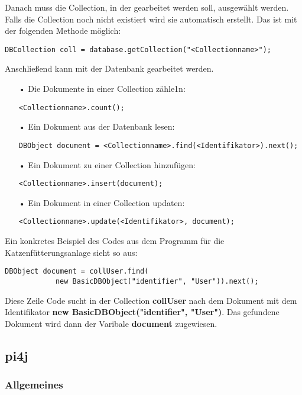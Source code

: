 Danach muss die Collection, in der gearbeitet werden soll, ausgewählt werden. Falls die Collection noch nicht existiert wird sie automatisch erstellt. Das ist mit der folgenden Methode möglich:
\begin{lstlisting}[style=JavaStyle]
	DBCollection coll = database.getCollection("<Collectionname>");
\end{lstlisting}
Anschließend kann mit der Datenbank gearbeitet werden. 
\begin{itemize}
\item[•] Die Dokumente in einer Collection zähle1n:
\begin{lstlisting}[style=JavaStyle]
	<Collectionname>.count();
\end{lstlisting}
\item[•] Ein Dokument aus der Datenbank lesen:
\begin{lstlisting}[style=JavaStyle]
	DBObject document = <Collectionname>.find(<Identifikator>).next();
\end{lstlisting}
\item[•] Ein Dokument zu einer Collection hinzufügen:
\begin{lstlisting}[style=JavaStyle]
	<Collectionname>.insert(document);
\end{lstlisting}	
\item[•] Ein Dokument in einer Collection updaten:
\begin{lstlisting}[style=JavaStyle]
	<Collectionname>.update(<Identifikator>, document);
\end{lstlisting}
\end{itemize}

\newpage

Ein konkretes Beispiel des Codes aus dem Programm für die Katzenfütterungsanlage sieht so aus:
\begin{lstlisting}[style=JavaStyle]
	DBObject document = collUser.find(
			new BasicDBObject("identifier", "User")).next();
\end{lstlisting}
Diese Zeile Code sucht in der Collection \textbf{collUser} nach dem Dokument mit dem Identifikator \textbf{new BasicDBObject("identifier", "User")}. Das gefundene Dokument wird dann der Varibale \textbf{document} zugewiesen. 


\subsection{pi4j}
\subsubsection{Allgemeines}
